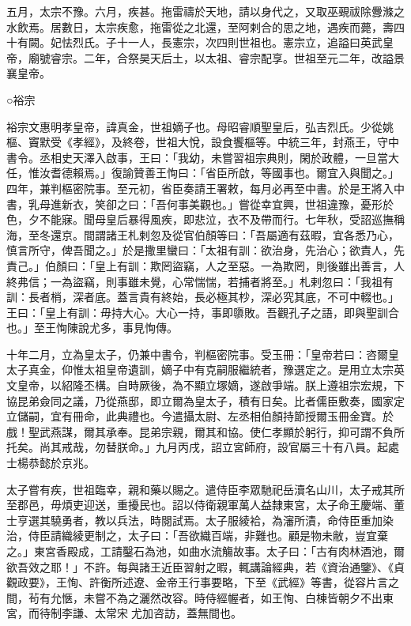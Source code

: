 \begin{pinyinscope}
 五月，太宗不豫。六月，疾甚。拖雷禱於天地，請以身代之，又取巫覡祓除釁滌之水飲焉。居數日，太宗疾愈，拖雷從之北還，至阿剌合的思之地，遇疾而薨，壽四十有闕。妃怯烈氏。子十一人，長憲宗，次四則世祖也。憲宗立，追謚曰英武皇帝，廟號睿宗。二年，合祭昊天后土，以太祖、睿宗配享。世祖至元二年，改謚景襄皇帝。



 ○裕宗



 裕宗文惠明孝皇帝，諱真金，世祖嫡子也。母昭睿順聖皇后，弘吉烈氏。少從姚樞、竇默受《孝經》，及終卷，世祖大悅，設食饗樞等。中統三年，封燕王，守中書令。丞相史天澤入啟事，王曰：「我幼，未嘗習祖宗典則，閑於政體，一旦當大任，惟汝耆德賴焉。」復諭贊善王恂曰：「省臣所啟，等國事也。爾宜入與聞之。」四年，兼判樞密院事。至元初，省臣奏請王署敕，每月必再至中書。於是王將入中書，乳母進新衣，笑卻之曰：「吾何事美觀也。」嘗從幸宜興，世祖違豫，憂形於色，夕不能寐。聞母皇后暴得風疾，即悲泣，衣不及帶而行。七年秋，受詔巡撫稱海，至冬還京。間謂諸王札剌忽及從官伯顏等曰：「吾屬適有茲暇，宜各悉乃心，慎言所守，俾吾聞之。」於是撒里蠻曰：「太祖有訓：欲治身，先治心；欲責人，先責己。」伯顏曰：「皇上有訓：欺罔盜竊，人之至惡。一為欺罔，則後雖出善言，人終弗信；一為盜竊，則事雖未覺，心常惴惴，若捕者將至。」札剌忽曰：「我祖有訓：長者梢，深者底。蓋言貴有終始，長必極其杪，深必究其底，不可中輟也。」王曰：「皇上有訓：毋持大心。大心一持，事即隳敗。吾觀孔子之語，即與聖訓合也。」至王恂陳說尤多，事見恂傳。



 十年二月，立為皇太子，仍兼中書令，判樞密院事。受玉冊：「皇帝若曰：咨爾皇太子真金，仰惟太祖皇帝遺訓，嫡子中有克嗣服繼統者，豫選定之。是用立太宗英文皇帝，以紹隆丕構。自時厥後，為不顯立塚嫡，遂啟爭端。朕上遵祖宗宏規，下協昆弟僉同之議，乃從燕邸，即立爾為皇太子，積有日矣。比者儒臣敷奏，國家定立儲嗣，宜有冊命，此典禮也。今遣攝太尉、左丞相伯顏持節授爾玉冊金寶。於戲！聖武燕謀，爾其承奉。昆弟宗親，爾其和協。使仁孝顯於躬行，抑可謂不負所托矣。尚其戒哉，勿替朕命。」九月丙戌，詔立宮師府，設官屬三十有八員。起處士楊恭懿於京兆。



 太子嘗有疾，世祖臨幸，親和藥以賜之。遣侍臣李眾馳祀岳瀆名山川，太子戒其所至郡邑，毋煩吏迎送，重擾民也。詔以侍衛親軍萬人益隸東宮，太子命王慶端、董士亨選其驍勇者，教以兵法，時閱試焉。太子服綾袷，為瀋所漬，命侍臣重加染治，侍臣請織綾更制之，太子曰：「吾欲織百端，非難也。顧是物未敝，豈宜棄之。」東宮香殿成，工請鑿石為池，如曲水流觴故事。太子曰：「古有肉林酒池，爾欲吾效之耶！」不許。每與諸王近臣習射之暇，輒講論經典，若《資治通鑒》、《貞觀政要》，王恂、許衡所述遼、金帝王行事要略，下至《武經》等書，從容片言之間，茍有允愜，未嘗不為之灑然改容。時侍經幄者，如王恂、白棟皆朝夕不出東宮，而待制李謙、太常宋尤加咨訪，蓋無間也。




\end{pinyinscope}
